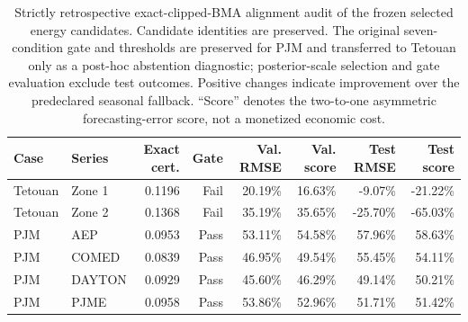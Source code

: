 \begin{table}[htbp]
\centering
\caption{Strictly retrospective exact-clipped-BMA alignment audit of the
frozen selected energy candidates. Candidate identities are preserved. The
original seven-condition gate and thresholds are preserved for PJM and
transferred to Tetouan only as a post-hoc abstention diagnostic;
posterior-scale selection and gate evaluation exclude test outcomes. Positive changes indicate improvement over the predeclared seasonal
fallback. ``Score'' denotes the two-to-one asymmetric forecasting-error
score, not a monetized economic cost.}
\label{tab:retrospective_bma_alignment}
\scriptsize
\setlength{\tabcolsep}{4pt}
\begin{tabular}{llrrrrrr}
\toprule
Case & Series & Exact cert. & Gate &
Val. RMSE & Val. score & Test RMSE & Test score \\
\midrule
Tetouan & Zone 1 & 0.1196 & Fail & 20.19\% & 16.63\% & -9.07\% & -21.22\% \\
Tetouan & Zone 2 & 0.1368 & Fail & 35.19\% & 35.65\% & -25.70\% & -65.03\% \\
\midrule
PJM & AEP    & 0.0953 & Pass & 53.11\% & 54.58\% & 57.96\% & 58.63\% \\
PJM & COMED  & 0.0839 & Pass & 46.95\% & 49.54\% & 55.45\% & 54.11\% \\
PJM & DAYTON & 0.0929 & Pass & 45.60\% & 46.29\% & 49.14\% & 50.21\% \\
PJM & PJME   & 0.0958 & Pass & 53.86\% & 52.96\% & 51.71\% & 51.42\% \\
\bottomrule
\end{tabular}
\end{table}
